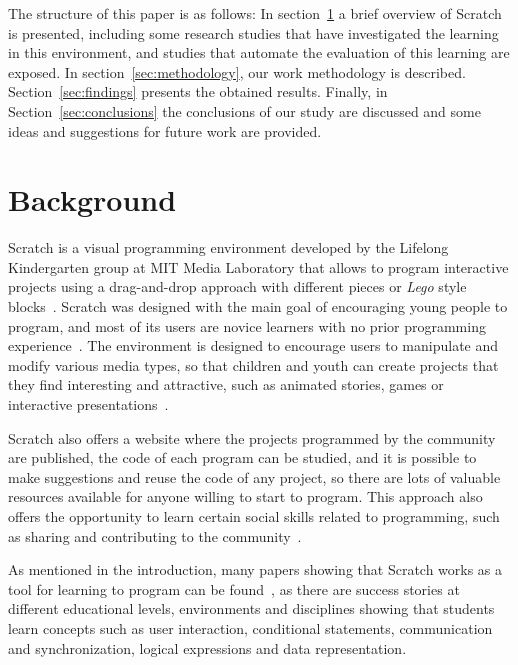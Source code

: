 \documentclass[conference]{format/IEEEtran}
\begin{document}
The structure of this paper is as follows: In section~\ref{sec:background} a brief overview of Scratch is presented, including some research studies that have investigated the learning in this environment, and studies that automate the evaluation of this learning are exposed. In section~\ref{sec:methodology}, our work methodology is described. Section~\ref{sec:findings} presents the obtained results. Finally, in Section~\ref{sec:conclusions} the conclusions of our study are discussed and some ideas and suggestions for future work are provided.

\section{Background}
\label{sec:background}

Scratch is a visual programming environment developed by the Lifelong Kindergarten group at MIT Media Laboratory that allows to program interactive projects using a drag-and-drop approach with different pieces or \textit {Lego} style blocks~\cite{resnick2009scratch}. Scratch was designed with the main goal of encouraging young people to program, and most of its users are novice learners with no prior programming experience~\cite{maloney2010scratch}. The environment is designed to encourage users to manipulate and modify various media types, so that children and youth can create projects that they find interesting and attractive, such as animated stories, games or interactive presentations~\cite{maloney2008programming}.

Scratch also offers a website where the projects programmed by the community are published, the code of each program can be studied, and it is possible to make suggestions and reuse the code of any project, so there are lots of valuable resources available for anyone willing to start to program. This approach also offers the opportunity to learn certain social skills related to programming, such as sharing and contributing to the community~\cite{scaffidi2012skill}.

As mentioned in the introduction, many papers showing that Scratch works as a tool for learning to program can be found~\cite{maloney2008programming, franklin2013assessment, scaffidi2012skill, malan2007scratch}, as there are success stories at different educational levels, environments and disciplines showing that students learn concepts such as user interaction, conditional statements, communication and synchronization, logical expressions and data representation.
\end{document}
